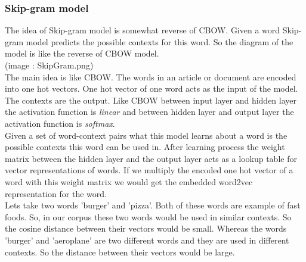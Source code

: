 \documentclass[12pt]{article}
\begin{document}
\subsubsection{Skip-gram model}
The idea of Skip-gram model is somewhat reverse of CBOW. Given a word Skip-gram model predicts the possible contexts for this word. So the diagram of the model is like the reverse of CBOW model.\\
(image : SkipGram.png)\\
The main idea is like CBOW. The words in an article or document are encoded into one hot vectors. One hot vector of one word acts as the input of the model. The contexts are the output. Like CBOW between input layer and hidden layer the activation function is \textit{linear} and between hidden layer and output layer the activation function is \textit{softmax}.\\
Given a set of word-context pairs what this model learns about a word is the possible contexts this word can be used in. After learning process the weight matrix between the hidden layer and the output layer acts as a lookup table for vector representations of words. If we multiply the encoded one hot vector of a word with this weight matrix we would get the embedded word2vec representation for the word.\\
Lets take two words 'burger' and 'pizza'. Both of these words are example of fast foods. So, in our corpus these two words would be used in similar contexts. So the cosine distance between their vectors would be small. Whereas the words 'burger' and 'aeroplane' are two different words and they are used in different contexts. So the distance between their vectors would be large.   
\end{document}
